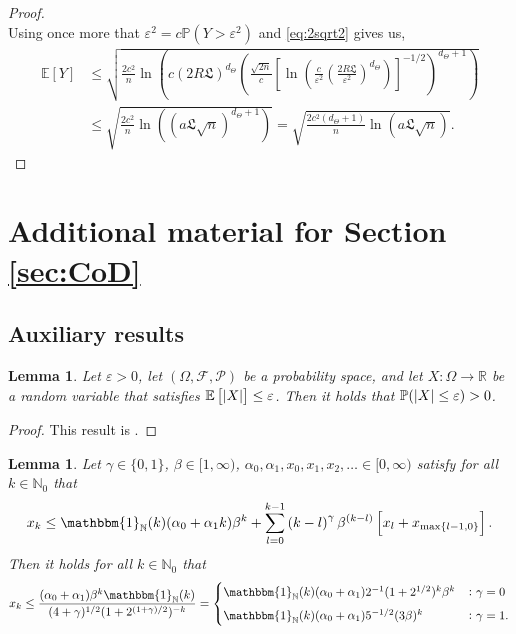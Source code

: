 \documentclass{article}
\numberwithin{equation}{section}
\newcommand{\N}{\mathbb{N}}
\renewcommand{\epsilon}{\varepsilon}
\newcommand{\1}{\mathbbm{1}}
\newcommand{\E}[1]{{\mathbb{E}\left[ #1 \right]}} %
\newcommand{\Prob}[1]{{\mathbb{P}\left( #1 \right)}} %
\newtheorem{lemma}[theorem]{Lemma}
\begin{document}
\begin{proof}
\begin{equation}
\end{equation}
Using once more that $\epsilon^2 = c \Prob{Y> \epsilon^2}$ and \eqref{eq:2sqrt2} gives us, 
\begin{equation}
    \begin{split}
\mathbb{E}[Y] &\leq \sqrt{\frac{2c^2}{n}\ln(c(2R\mathfrak{L})^{{d_\Theta}}\left(\frac{\sqrt{2n}}{c}\left[\ln(\frac{c}{\epsilon^2}\left(\frac{2R\mathfrak{L}}{\epsilon^2}\right)^{d_\Theta})\right]^{-1/2}\right)^{{d_\Theta}+1})}\\
&\leq \sqrt{\frac{2c^2}{n}\ln((a\mathfrak{L}\sqrt{n})^{{d_\Theta}+1})} = \sqrt{\frac{2c^2({d_\Theta}+1)}{n}\ln(a\mathfrak{L}\sqrt{n})}.
    \end{split}
\end{equation}
\end{proof}

\section{Additional material for Section \ref{sec:CoD}}\label{app:AC}

\subsection{Auxiliary results}

\begin{lemma}\label{lem:exp-to-prob}
Let $\epsilon>0$, let $(\Omega, \mathcal{F}, \mathcal{P})$ be a probability space, and let $X:\Omega\to\mathbb{R}$ be a random variable that satisfies $\E{\abs{X}}\leq \epsilon$. Then it holds that $\mathbb{P}(\abs{X}\leq \epsilon)>0$. 
\end{lemma}
\begin{proof}
This result is \cite[Proposition 3.3]{grohs2018proof}.
\end{proof}

\begin{lemma}
\label{lem:recursion1}
Let
$ \gamma \in \{0,1\}$,
$ \beta \in [1,\infty) $,
$
  \alpha_0, \alpha_1, x_0, x_1, x_2, \ldots \in [0,\infty) 
$
satisfy
for all $ k \in \N_0 $
that
\begin{equation}\label{eq:full_history_eq}
  x_k
\leq
  \1_{ \N }( k )
  (\alpha_0+\alpha_1k)\beta^k
  +
  \sum_{ l = 0 }^{ k - 1 }
  \left(k - l\right)^\gamma 
  \beta^{ ( k - l ) }
  \left[
    x_l
    +
    x_{ \max\{ l - 1 , 0 \} }
  \right]
  .
\end{equation}
Then it holds for all 
$ k \in \N_0 $ that
\begin{equation}\label{eq:a_bd}
\begin{split}
x_k \le 
\frac{(\alpha_0 + \alpha_1) \beta^k \1_\N(k)}{(4 + \gamma)^{1/2} (1 + 2^{(1+\gamma)/2})^{-k}}
= 
\begin{cases}
\1_{ \N }( k )(\alpha_0+\alpha_1) 2^{-1} (1+ 2^{1/2} )^k \beta^ k & \colon \gamma = 0 \\[0.5em]
\1_{ \N }( k ) (\alpha_0+\alpha_1) 5^{-1/2} (3\beta) ^ k & \colon \gamma = 1.
\end{cases}
\end{split}
\end{equation}
\end{lemma}
\end{document}
